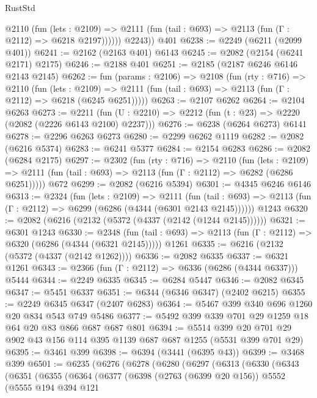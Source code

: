 \begin{lexlean}{RustStd}
\begin{coremodule}
            @2110
              (fun (lets : @2109) =>
              @2111 (fun (tail : @693) => @2113 (fun (Γ : @2112) => @6218 @2197))))))
        @2243))
    @401
@6238 := @2249 (@6211 (@2099 @401))
@6241 := @2162 (@2163 @401) @6143
@6245 := @2082 (@2154 (@6241 @2171) @2175)
@6246 := @2188 @401
@6251 := @2185 (@2187 @6246 @6146 @2143 @2145)
@6262 := fun (params : @2106) =>
  @2108
    (fun (rty : @716) =>
    @2110
      (fun (lets : @2109) =>
      @2111 (fun (tail : @693) => @2113 (fun (Γ : @2112) => @6218 (@6245 @6251)))))
@6263 := @2107 @6262
@6264 := @2104 @6263
@6273 := @2211 (fun (U : @2210) => @2212 (fun (t : @23) => @2220 (@2082 (@2226 @6143 @2100) @2237)))
@6276 := @6238 (@6264 @6273) @6141
@6278 := @2296 @6263 @6273
@6280 := @2299 @6262 @1119
@6282 := @2082 (@6216 @5374)
@6283 := @6241 @5377
@6284 := @2154 @6283
@6286 := @2082 (@6284 @2175)
@6297 := @2302
    (fun (rty : @716) =>
    @2110
      (fun (lets : @2109) =>
      @2111 (fun (tail : @693) => @2113 (fun (Γ : @2112) => @6282 (@6286 @6251)))))
    @672
@6299 := @2082 (@6216 @5394)
@6301 := @4345 @6246 @6146
@6313 := @2324
    (fun (lets : @2109) =>
    @2111
      (fun (tail : @693) => @2113 (fun (Γ : @2112) => @6299 (@6286 (@4344 (@6301 @2143 @2145))))))
    @1243
@6320 := @2082 (@6216 (@2132 (@5372 (@4337 (@2142 (@1244 @2145))))))
@6321 := @6301 @1243
@6330 := @2348
    (fun (tail : @693) => @2113 (fun (Γ : @2112) => @6320 (@6286 (@4344 (@6321 @2145)))))
    @1261
@6335 := @6216 (@2132 (@5372 (@4337 (@2142 @1262))))
@6336 := @2082 @6335
@6337 := @6321 @1261
@6343 := @2366 (fun (Γ : @2112) => @6336 (@6286 (@4344 @6337))) @5444
@6344 := @2249 @6335
@6345 := @6284 @5447
@6346 := @2082 @6345
@6347 := @5451 @6337
@6351 := @6344 (@6346 @6347) (@2402 @6215)
@6355 := @2249 @6345 @6347 (@2407 @6283)
@6364 := @5467 @399 @340 @696 @1260 @20 @834 @543 @749 @5486
@6377 := @5492 @399 @339 @701 @29 @1259 @18 @64 @20 @83 @866 @687 @687 @801
@6394 := @5514 @399 @20 @701 @29 @902 @43 @156 @114 @395 @1139 @687 @687 @1255 (@5531 @399 @701 @29)
@6395 := @3461 @399
@6398 := @6394 (@3441 (@6395 @43))
@6399 := @3468 @399
@6501 := @6235
    (@6276
      (@6278
        (@6280
          (@6297
            (@6313
              (@6330
                (@6343
                  (@6351
                    (@6355
                      (@6364
                        (@6377
                          (@6398
                            (@2763 (@6399 @20 @156))
                            @5552
                            (@5555
                              @194
                              @394
                              @121

\end{coremodule}
\end{lexlean}
